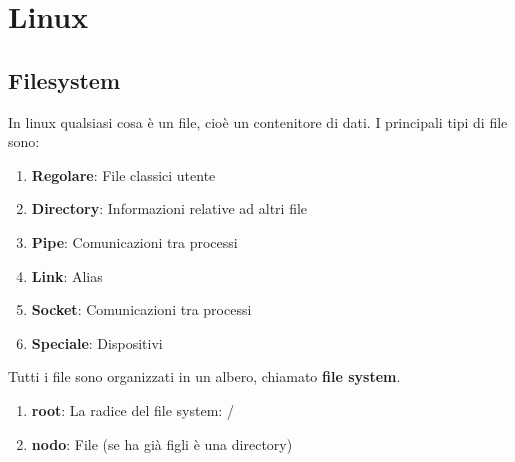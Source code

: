 \documentclass[a4paper]{article}
\begin{document}
\section{Linux}
\subsection{Filesystem}
In linux qualsiasi cosa è un file, cioè un contenitore di dati. I principali
tipi di file sono:
\begin{enumerate}
  \item \textbf{Regolare}: File classici utente
  \item \textbf{Directory}: Informazioni relative ad altri file
  \item \textbf{Pipe}: Comunicazioni tra processi
  \item \textbf{Link}: Alias
  \item \textbf{Socket}: Comunicazioni tra processi
  \item \textbf{Speciale}: Dispositivi
\end{enumerate}

\noindent Tutti i file sono organizzati in un albero, chiamato \textbf{file system}.
\begin{enumerate}
  \item \textbf{root}: La radice del file system: /
  \item \textbf{nodo}: File (se ha già figli è una directory)
\end{enumerate}
\end{document}
